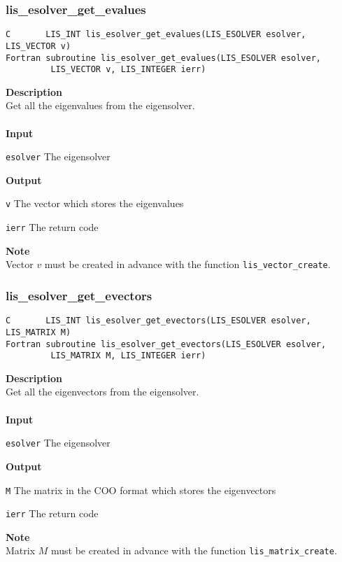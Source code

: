 \documentclass[a4paper]{article}
\newcommand{\namelistlabel}[1]{\mbox{#1}\hfill}
\newenvironment{namelist}[1]{%
\begin{list}{}
  {\let\makelabel\namelistlabel
  \settowidth{\labelwidth}{#1}
  \setlength{\leftmargin}{1.1\labelwidth}}
  }{%
\end{list}}
\begin{document}
\subsubsection{lis\_esolver\_get\_evalues}
\begin{screen}
\verb|C       LIS_INT lis_esolver_get_evalues(LIS_ESOLVER esolver, LIS_VECTOR v)|\\
\verb|Fortran subroutine lis_esolver_get_evalues(LIS_ESOLVER esolver,|\\
\verb|         LIS_VECTOR v, LIS_INTEGER ierr)|
\end{screen}
{\bf Description}\\
\indent
Get all the eigenvalues from the eigensolver.
\\ \\
\noindent
{\bf Input}
\begin{namelist}{XXXXXXXXXXXXXXXXXXXX}
\item[\tt esolver] The eigensolver
\end{namelist}
{\bf Output}
\begin{namelist}{XXXXXXXXXXXXXXXXXXXX}
\item[\tt v]  The vector which stores the eigenvalues
\item[\tt ierr] The return code
\end{namelist}
{\bf Note}\\
\indent
Vector $v$ must be created in advance with the function \verb|lis_vector_create|. 

\newpage
\subsubsection{lis\_esolver\_get\_evectors}
\begin{screen}
\verb|C       LIS_INT lis_esolver_get_evectors(LIS_ESOLVER esolver, LIS_MATRIX M)|\\
\verb|Fortran subroutine lis_esolver_get_evectors(LIS_ESOLVER esolver,|\\
\verb|         LIS_MATRIX M, LIS_INTEGER ierr)|
\end{screen}
{\bf Description}\\
\indent
Get all the eigenvectors from the eigensolver.
\\ \\
\noindent
{\bf Input}
\begin{namelist}{XXXXXXXXXXXXXXXXXXXX}
\item[\tt esolver] The eigensolver
\end{namelist}
{\bf Output}
\begin{namelist}{XXXXXXXXXXXXXXXXXXXX}
\item[\tt M]  The matrix in the COO format which stores the eigenvectors
\item[\tt ierr] The return code
\end{namelist}
{\bf Note}\\
\indent
Matrix $M$ must be created in advance with the function \verb|lis_matrix_create|. 
\end{document}
